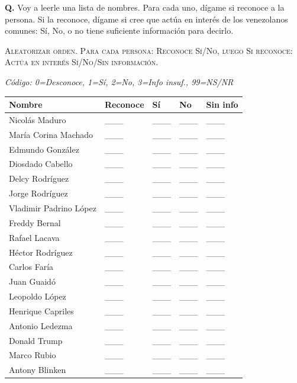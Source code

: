\documentclass[11pt,letterpaper]{article}
\newcounter{question}
\newcommand{\question}[1]{%
  \stepcounter{question}%
  \vspace{0.3em}%
  \noindent\textbf{Q\thequestion.} #1%
}
\newcommand{\instruction}[1]{%
  \vspace{0.1em}%
  \noindent\textsc{\small #1}%
  \vspace{0.1em}%
}
\newcommand{\surveynote}[1]{%
  \vspace{0.1em}%
  \noindent\textit{\small #1}%
  \vspace{0.1em}%
}
\begin{document}
\question{Voy a leerle una lista de nombres. Para cada uno, dígame si reconoce a la persona. Si la reconoce, dígame si cree que actúa en interés de los venezolanos comunes: Sí, No, o no tiene suficiente información para decirlo.}

\instruction{Aleatorizar orden. Para cada persona: Reconoce Sí/No, luego Si reconoce: Actúa en interés Sí/No/Sin información.}

\surveynote{Código: 0=Desconoce, 1=Sí, 2=No, 3=Info insuf., 99=NS/NR}

\vspace{0.3em}
\begin{tabular}{p{5cm}p{2cm}p{2cm}p{2cm}p{2cm}}
\textbf{Nombre} & \textbf{Reconoce} & \textbf{Sí} & \textbf{No} & \textbf{Sin info} \\
\midrule
Nicolás Maduro & \_\_\_ & \_\_\_ & \_\_\_ & \_\_\_ \\
María Corina Machado & \_\_\_ & \_\_\_ & \_\_\_ & \_\_\_ \\
Edmundo González & \_\_\_ & \_\_\_ & \_\_\_ & \_\_\_ \\
Diosdado Cabello & \_\_\_ & \_\_\_ & \_\_\_ & \_\_\_ \\
Delcy Rodríguez & \_\_\_ & \_\_\_ & \_\_\_ & \_\_\_ \\
Jorge Rodríguez & \_\_\_ & \_\_\_ & \_\_\_ & \_\_\_ \\
Vladimir Padrino López & \_\_\_ & \_\_\_ & \_\_\_ & \_\_\_ \\
Freddy Bernal & \_\_\_ & \_\_\_ & \_\_\_ & \_\_\_ \\
Rafael Lacava & \_\_\_ & \_\_\_ & \_\_\_ & \_\_\_ \\
Héctor Rodríguez & \_\_\_ & \_\_\_ & \_\_\_ & \_\_\_ \\
Carlos Faría & \_\_\_ & \_\_\_ & \_\_\_ & \_\_\_ \\
Juan Guaidó & \_\_\_ & \_\_\_ & \_\_\_ & \_\_\_ \\
Leopoldo López & \_\_\_ & \_\_\_ & \_\_\_ & \_\_\_ \\
Henrique Capriles & \_\_\_ & \_\_\_ & \_\_\_ & \_\_\_ \\
Antonio Ledezma & \_\_\_ & \_\_\_ & \_\_\_ & \_\_\_ \\
Donald Trump & \_\_\_ & \_\_\_ & \_\_\_ & \_\_\_ \\
Marco Rubio & \_\_\_ & \_\_\_ & \_\_\_ & \_\_\_ \\
Antony Blinken & \_\_\_ & \_\_\_ & \_\_\_ & \_\_\_ \\
\end{tabular}
\end{document}
